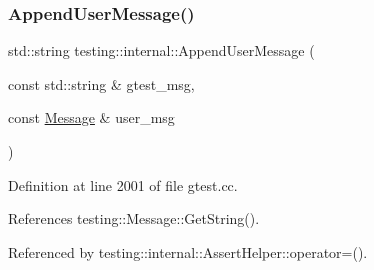 \subsubsection{\texorpdfstring{Append\+User\+Message()}{AppendUserMessage()}}
{\footnotesize\ttfamily std\+::string testing\+::internal\+::\+Append\+User\+Message (\begin{DoxyParamCaption}\item[{const std\+::string \&}]{gtest\+\_\+msg,  }\item[{const \hyperlink{classtesting_1_1Message}{Message} \&}]{user\+\_\+msg }\end{DoxyParamCaption})}



Definition at line 2001 of file gtest.\+cc.



References testing\+::\+Message\+::\+Get\+String().



Referenced by testing\+::internal\+::\+Assert\+Helper\+::operator=().


